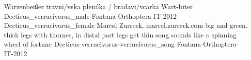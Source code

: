 {Warzenbeißer} %
{travni/v{s}ka plenilka / bradavi/v{c}arka} %
{Wart-biter} %
{Decticus_verrucivorus_male}  %
{Fontana-Orthoptera-IT-2012} %
{Decticus_verrucivorus_female} %
{Marcel Zurreck, marcel.zurreck.com} %
{big and green, thick legs with thornes, in distal part legs get thin} %
{song sounds like a spinning wheel of fortune} %
{Decticus-verrucivorus-verrucivorus_song} %
{Fontana-Orthoptera-IT-2012} %
